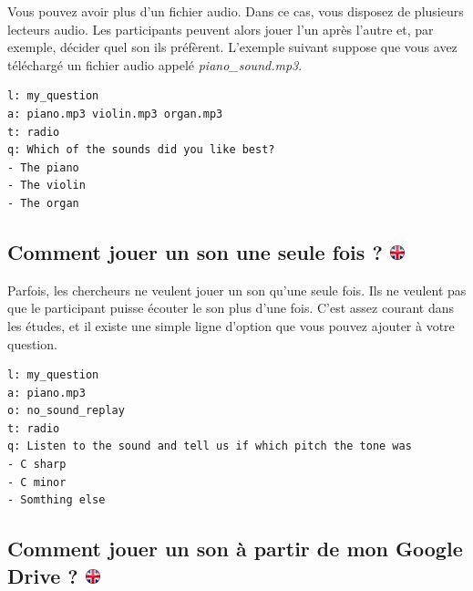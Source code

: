 \documentclass[
]{book}
\begin{document}
Vous pouvez avoir plus d'un fichier audio. Dans ce cas, vous disposez de
plusieurs lecteurs audio. Les participants peuvent alors jouer l'un
après l'autre et, par exemple, décider quel son ils préfèrent. L'exemple
suivant suppose que vous avez téléchargé un fichier audio appelé
\emph{piano\_sound.mp3}.

\begin{verbatim}
l: my_question
a: piano.mp3 violin.mp3 organ.mp3
t: radio
q: Which of the sounds did you like best?
- The piano
- The violin
- The organ
\end{verbatim}

\hypertarget{comment-jouer-un-son-une-seule-fois}{%
\subsection[Comment jouer un son une seule fois ?
]{\texorpdfstring{Comment jouer un son une seule fois ?
\href{https://www.psytoolkit.org/lessons/surveyaudiovideo.html\#_how_to_play_a_sound_only_one_time}{\protect\includegraphics{img/ukflag.png}}}{Comment jouer un son une seule fois ? }}\label{comment-jouer-un-son-une-seule-fois}}

Parfois, les chercheurs ne veulent jouer un son qu'une seule fois. Ils
ne veulent pas que le participant puisse écouter le son plus d'une fois.
C'est assez courant dans les études, et il existe une simple ligne
d'option que vous pouvez ajouter à votre question.

\begin{verbatim}
l: my_question
a: piano.mp3
o: no_sound_replay
t: radio
q: Listen to the sound and tell us if which pitch the tone was
- C sharp
- C minor
- Somthing else
\end{verbatim}

\hypertarget{comment-jouer-un-son-uxe0-partir-de-mon-google-drive}{%
\subsection[Comment jouer un son à partir de mon Google Drive ?
]{\texorpdfstring{Comment jouer un son à partir de mon Google Drive ?
\href{https://www.psytoolkit.org/lessons/surveyaudiovideo.html\#_how_to_play_a_sound_from_my_google_drive}{\protect\includegraphics{img/ukflag.png}}}{Comment jouer un son à partir de mon Google Drive ? }}\label{comment-jouer-un-son-uxe0-partir-de-mon-google-drive}}
\end{document}
